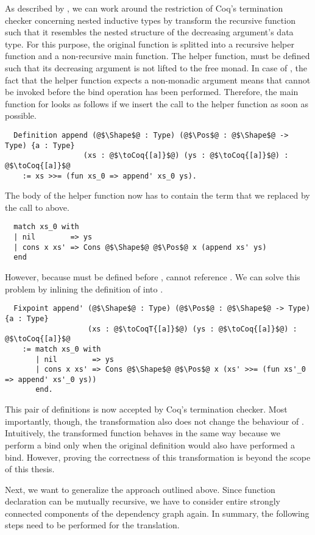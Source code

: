 As described by \cite{Dylus:2018}, we can work around the restriction of Coq's termination checker concerning nested inductive types by transform the recursive function such that it resembles the nested structure of the decreasing argument's data type.
For this purpose, the original function is splitted into a recursive helper function and a non-recursive main function.
The helper function, must be defined such that its decreasing argument is not lifted to the free monad.
In case of , the fact that the helper function  expects a non-monadic argument means that  cannot be invoked before the bind operation has been performed.
Therefore, the main function for  looks as follows if we insert the call to the helper function as soon as possible.
\begin{verbatim}
  Definition append (@$\Shape$@ : Type) (@$\Pos$@ : @$\Shape$@ -> Type) {a : Type}
                  (xs : @$\toCoq{[a]}$@) (ys : @$\toCoq{[a]}$@) : @$\toCoq{[a]}$@
    := xs >>= (fun xs_0 => append' xs_0 ys).
\end{verbatim}
The body of the helper function now has to contain the  term that we replaced by the call to  above.
\begin{verbatim}
  match xs_0 with
  | nil        => ys
  | cons x xs' => Cons @$\Shape$@ @$\Pos$@ x (append xs' ys)
  end
\end{verbatim}
However, because  must be defined before ,  cannot reference .
We can solve this problem by inlining the definition of  into .
\begin{verbatim}
  Fixpoint append' (@$\Shape$@ : Type) (@$\Pos$@ : @$\Shape$@ -> Type) {a : Type}
                   (xs : @$\toCoqT{[a]}$@) (ys : @$\toCoq{[a]}$@) : @$\toCoq{[a]}$@
    := match xs_0 with
       | nil        => ys
       | cons x xs' => Cons @$\Shape$@ @$\Pos$@ x (xs' >>= (fun xs'_0 => append' xs'_0 ys))
       end.
\end{verbatim}
This pair of definitions is now accepted by Coq's termination checker.
Most importantly, though, the transformation also does not change the behaviour of .
Intuitively, the transformed function behaves in the same way because we perform a bind only when the original definition would also have performed a bind.
However, proving the correctness of this transformation is beyond the scope of this thesis.

Next, we want to generalize the approach outlined above.
Since function declaration can be mutually recursive, we have to consider entire strongly connected components of the dependency graph again.
In summary, the following steps need to be performed for the translation.

